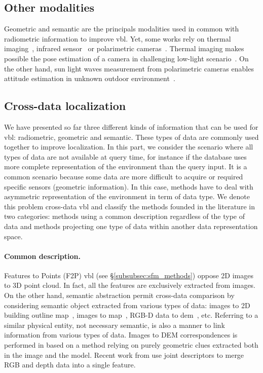 	\subsection{Other modalities}
	\label{subsec:other_modalities}
	
	Geometric and semantic are the principals modalities used in common with radiometric information to improve \ac{vbl}. Yet, some works rely on thermal imaging~\citep{Lu2016}, infrared sensor~\citep{Bonardi2017} or polarimetric cameras~\citep{Rastgoo2018}. Thermal imaging makes possible the pose estimation of a camera in challenging low-light scenario~\citep{Lu2016}. On the other hand, sun light waves measurement from polarimetric cameras enables attitude estimation in unknown outdoor environment~\citep{Rastgoo2018}.
				
	\subsection{Cross-data localization}
	\label{subsec:cross_data}        
		We have presented so far three different kinds of information that can be used for \ac{vbl}: radiometric, geometric and semantic. These types of data are commonly used together to improve localization. In this part, we consider the scenario where all types of data are not available at query time, for instance if the database uses more complete representation of the environment than the query input. It is a common scenario because some data are more difficult to acquire or required specific sensors (\eg geometric information). In this case, methods have to deal with asymmetric representation of the environment in term of data type. We denote this problem cross-data \ac{vbl} and classify the methods founded in the literature in two categories: methods using a common description regardless of the type of data and methods projecting one type of data within another data representation space.
		
    	\paragraph{Common description.}
    		Features to Points (F2P) \ac{vbl} (see \S\ref{subsubsec:sfm_methods}) oppose 2D images to 3D point cloud. In fact, all the features are exclusively extracted from images. On the other hand, semantic abstraction permit cross-data comparison by considering semantic object extracted from various types of data: images to 2D building outline map~\citep{Cham2010}, images to map~\citep{Ardeshir2014,Qu2015,Castaldo2015,Brubaker2016}, RGB-D data to \ac{dem}~\citep{Christie2016}, etc. Referring to a similar physical entity, not necessary semantic, is also a manner to link information from various types of data. Images to DEM correspondences is performed in \citep{Bansal2014} based on a method relying on purely geometric clues extracted both in the image and the model. Recent work from \citep{Sizikova2016,Li2017} use joint descriptors to merge RGB and depth data into a single feature.
					
